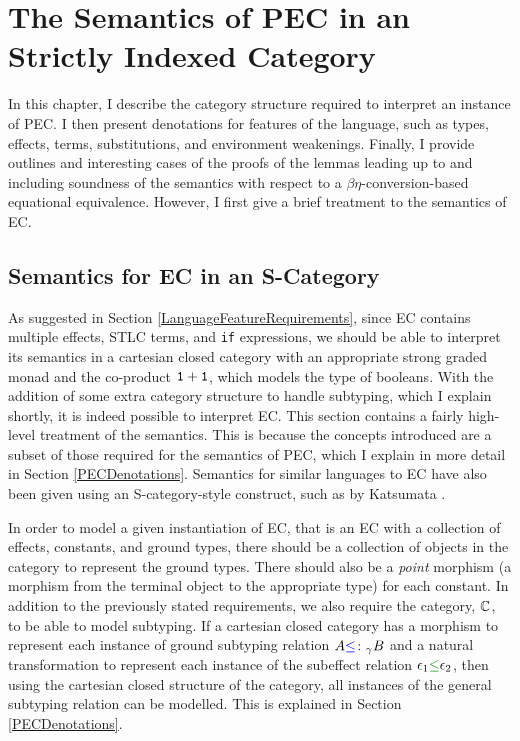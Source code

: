 \documentclass{Report}
\begin{document}
\chapter{The Semantics of PEC in an Strictly Indexed Category}
In this chapter, I  describe the category structure required to interpret an instance of PEC\@. I then present denotations for features of the language, such as types, effects, terms, substitutions, and environment weakenings. Finally, I provide outlines and interesting cases of the proofs of the lemmas leading up to and including soundness of the semantics with respect to a $\beta\eta$-conversion-based equational equivalence. However, I first give a brief treatment to the semantics of EC.


\section{Semantics for EC in an S-Category}\label{SCategoryIntro}

As suggested in Section \ref{LanguageFeatureRequirements}, since EC contains multiple effects, STLC terms, and \texttt{if} expressions, we should be able to interpret its semantics in a cartesian closed category with an appropriate strong graded monad and the co-product $\texttt{1} + \texttt{1}$, which models the type of booleans. With the addition of some extra category structure to handle subtyping, which I explain shortly, it is indeed possible to interpret EC. This section contains a fairly high-level treatment of the semantics. This is because the concepts introduced are a subset of those required for the semantics of PEC, which I explain in more detail in Section \ref{PECDenotations}. Semantics for similar languages to EC have also been given using an S-category-style construct, such as by Katsumata \cite{Katsumata:2014}. 

In order to model a given instantiation of EC, that is an EC with a collection of effects, constants, and ground types, there should be a collection of objects in the category to represent the ground types. There should also be a \textit{point} morphism (a morphism from the terminal object to the appropriate type) for each constant. In addition to the previously stated requirements, we also require the category, $\mathbb{C}$, to be able to model subtyping. If a cartesian closed category has a morphism to represent each instance of  ground subtyping relation $A{\color{blue} \leq\colon}_\gamma B$ and a natural transformation to represent each instance of the subeffect relation $\e_1\subeffect \e_2$, then using the cartesian closed structure of the category, all instances of the general subtyping relation can be modelled. This is explained in Section \ref{PECDenotations}.
\end{document}
